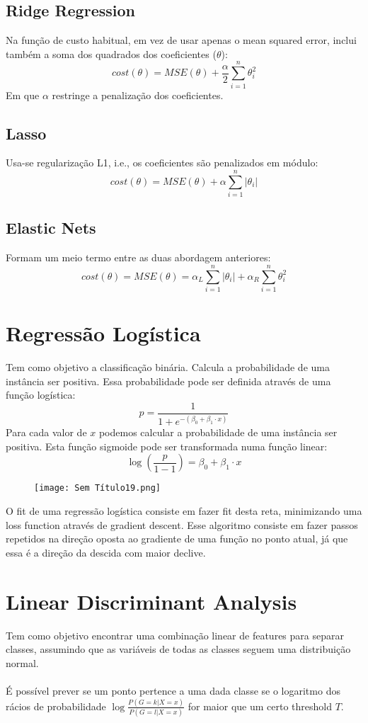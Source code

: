 \documentclass[10pt,a4paper]{report}
\begin{document}
\subsection{Ridge Regression}
Na função de custo habitual, em vez de usar apenas o mean squared error, inclui também a soma dos quadrados dos coeficientes ($\theta$):
$$
cost(\theta) = MSE(\theta) + \frac{\alpha}{2}\sum_{i=1}^n \theta_i^2
$$
Em que $\alpha$ restringe a penalização dos coeficientes.
\subsection{Lasso}
Usa-se regularização L1, i.e., os coeficientes são penalizados em módulo:
$$
cost(\theta) = MSE(\theta) + \alpha \sum_{i = 1}^n |\theta_i|
$$
\subsection{Elastic Nets}
Formam um meio termo entre as duas abordagem anteriores:
$$
cost(\theta) = MSE(\theta) = \alpha_L \sum_{i=1}^n |\theta_i| + \alpha_R \sum_{i=1}^n \theta_i^2
$$
\section{Regressão Logística}
Tem como objetivo a classificação binária. Calcula a probabilidade de uma instância ser positiva. Essa probabilidade pode ser definida através de uma função logística:
$$
p = \frac{1}{1 + e^{-(\beta_0 + \beta_1\cdot x)}}
$$
Para cada valor de $x$ podemos calcular a probabilidade de uma instância ser positiva. Esta função sigmoide pode ser transformada numa função linear:
$$
\log \left(\frac{p}{1 - 1}\right) = \beta_0 + \beta_1 \cdot x
$$
\begin{figure}[H]
\centering
\texttt{[image: Sem Título19.png]}
\end{figure}
O fit de uma regressão logística consiste em fazer fit desta reta, minimizando uma loss function através de gradient descent. Esse algoritmo consiste em fazer passos repetidos na direção oposta ao gradiente de uma função no ponto atual, já que essa é a direção da descida com maior declive.
\section{Linear Discriminant Analysis}
Tem como objetivo encontrar uma combinação linear de features para separar classes, assumindo que as variáveis de todas as classes seguem uma distribuição normal.\\
\\
É possível prever se um ponto pertence a uma dada classe se o logaritmo dos rácios de probabilidade $\log \frac{P(G = k | X = x)}{P(G = l | X = x)}$ for maior que um certo threshold $T$.
\end{document}
